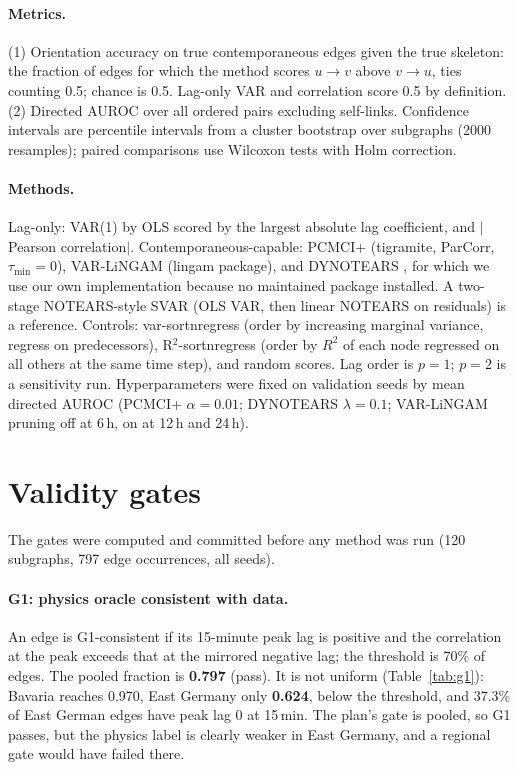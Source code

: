 \documentclass[10pt,a4paper]{article}
\begin{document}
\paragraph{Metrics.}
(1) Orientation accuracy on true contemporaneous edges given the true skeleton: the fraction of edges for which the method scores $u\to v$ above $v\to u$, ties counting 0.5; chance is 0.5. Lag-only VAR and correlation score 0.5 by definition. (2) Directed AUROC over all ordered pairs excluding self-links. Confidence intervals are percentile intervals from a cluster bootstrap over subgraphs (2000 resamples); paired comparisons use Wilcoxon tests with Holm correction.

\paragraph{Methods.}
Lag-only: VAR(1) by OLS scored by the largest absolute lag coefficient, and $|$Pearson correlation$|$. Contemporaneous-capable: PCMCI+ \citep{runge2020pcmciplus,runge2019pcmci} (tigramite, ParCorr, $\tau_{\min}=0$), VAR-LiNGAM \citep{hyvarinen2010svar} (lingam package), and DYNOTEARS \citep{pamfil2020dynotears}, for which we use our own implementation because no maintained package installed. A two-stage NOTEARS-style SVAR (OLS VAR, then linear NOTEARS on residuals) is a reference. Controls: var-sortnregress (order by increasing marginal variance, regress on predecessors), R$^2$-sortnregress (order by $R^2$ of each node regressed on all others at the same time step), and random scores. Lag order is $p=1$; $p=2$ is a sensitivity run. Hyperparameters were fixed on validation seeds by mean directed AUROC (PCMCI+ $\alpha=0.01$; DYNOTEARS $\lambda=0.1$; VAR-LiNGAM pruning off at 6\,h, on at 12\,h and 24\,h).

\section{Validity gates}
The gates were computed and committed before any method was run (120 subgraphs, 797 edge occurrences, all seeds).

\paragraph{G1: physics oracle consistent with data.}
An edge is G1-consistent if its 15-minute peak lag is positive and the correlation at the peak exceeds that at the mirrored negative lag; the threshold is 70\% of edges. The pooled fraction is \textbf{0.797} (pass). It is not uniform (Table~\ref{tab:g1}): Bavaria reaches 0.970, East Germany only \textbf{0.624}, below the threshold, and 37.3\% of East German edges have peak lag 0 at 15\,min. The plan's gate is pooled, so G1 passes, but the physics label is clearly weaker in East Germany, and a regional gate would have failed there.
\end{document}
